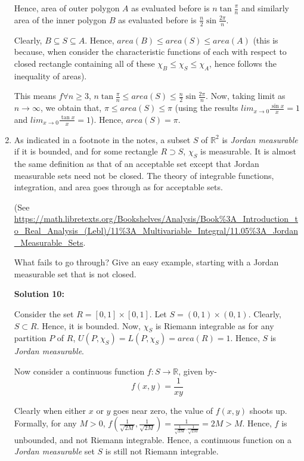 \documentclass[11pt]{amsart}
\newcommand{\bbR}{\mathbb{R}}
\theoremstyle{definition}
\begin{document}
\begin{enumerate}[wide, labelwidth=!, labelindent=0pt]
Hence, area of outer polygon $A$ as evaluated before is $n\tan{\frac{\pi}{n}}$ and similarly area of the inner polygon $B$ as evaluated before is $\frac{n}{2} \sin{\frac{2\pi}{n}}$.

Clearly, $B \subseteq S \subseteq A$. Hence, $area(B) \le area(S) \le area(A)$ (this is because, when consider the characteristic functions of each with respect to closed rectangle containing all of these $\chi_B \le \chi_S \le \chi_A$, hence follows the inequality of areas).

This means $f\forall n \ge 3$, $n\tan{\frac{\pi}{n}} \le area(S) \le \frac{n}{2} \sin{\frac{2\pi}{n}}$. Now, taking limit as $n \to \infty$, we obtain that, $\pi \le area(S) \le \pi$ (using the results $lim_{x \to 0} \frac{\sin{x}}{x} = 1$ and $lim_{x \to 0} \frac{\tan{x}}{x} = 1$). Hence, $area(S) = \pi$.

\newpage
\item As indicated in a footnote in the notes, a subset $S$ of $\bbR^2$ is \emph{Jordan measurable} if it is bounded, and for some rectangle $R \supset S$,
$\chi_S$ is measurable. It is almost the same definition as that of an acceptable set except that Jordan measurable sets need not be closed. The theory of integrable functions, integration, and area goes through as for acceptable sets. 

(See
\url{https://math.libretexts.org/Bookshelves/Analysis/Book%3A_Introduction_to_Real_Analysis_(Lebl)/11%3A_Multivariable_Integral/11.05%3A_Jordan_Measurable_Sets}.

What fails to go through? Give an easy example, starting with a Jordan measurable set that is not closed.

\textbf{Solution 10:}

Consider the set $R = [0,1] \times [0,1]$. Let $S = (0,1) \times (0,1)$. Clearly, $S \subset R$. Hence, it is bounded. Now, $\chi_S$ is Riemann integrable as for any partition $P$ of $R$, $U(P,\chi_S) = L(P,\chi_S) = area(R) = 1$. Hence, $S$ is \textit{Jordan measurable}.

Now consider a continuous function $f:S \to \bbR$, given by- $$f(x,y) = \frac{1}{xy}$$ 

Clearly when either $x$ or $y$ goes near zero, the value of $f(x,y)$ shoots up. Formally, for any $M>0$, $f(\frac{1}{\sqrt{2M}},\frac{1}{\sqrt{2M}}) = \frac{1}{\frac{1}{\sqrt{2M}}.\frac{1}{\sqrt{2M}}} = 2M > M$. Hence, $f$ is unbounded, and not Riemann integrable. Hence, a continuous function on a \textit{Jordan measurable} set $S$ is still not Riemann integrable.

\end{enumerate}
\end{document}
